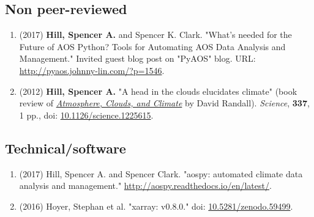\documentclass[12pt,letterpaper]{shillcv}
\begin{document}
\subsection*{Non peer-reviewed}
\label{sec:org9ad8fe9}
\begin{enumerate}
\item (2017) \textbf{Hill, Spencer A.} and Spencer K. Clark.  "What’s needed for the Future
of AOS Python? Tools for Automating AOS Data Analysis and Management."
Invited guest blog post on "PyAOS" blog.  URL:
\url{http://pyaos.johnny-lin.com/?p=1546}.
\item (2012) \textbf{Hill, Spencer A.}  "A head in the clouds elucidates climate" (book
review of \href{http://press.princeton.edu/titles/9773.html}{\emph{Atmosphere, Clouds, and Climate}} by David Randall). \emph{Science}, \textbf{337},
1 pp., doi: \href{http://dx.doi.org/10.1126/science.1225615}{10.1126/science.1225615}.
\end{enumerate}
\subsection*{Technical/software}
\label{sec:org602db9d}
\begin{enumerate}
\item (2017) Hill, Spencer A. and Spencer Clark.  "aospy: automated climate data
analysis and management."  \url{http://aospy.readthedocs.io/en/latest/}.
\item (2016) Hoyer, Stephan et al.  "xarray: v0.8.0."  doi: \href{https://doi.org/10.5281/zenodo.59499}{10.5281/zenodo.59499}.
\end{enumerate}
\end{document}
